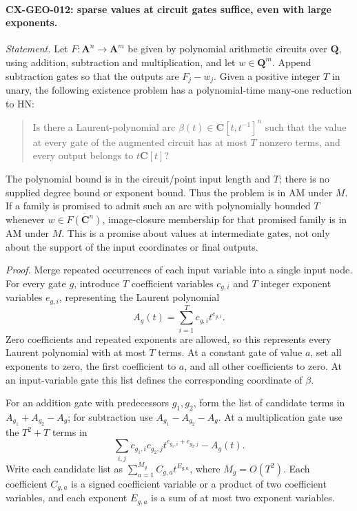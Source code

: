 \documentclass[11pt,a4paper]{article}
\begin{document}
\paragraph{CX-GEO-012: sparse values at circuit gates suffice, even with large exponents.}
\emph{Statement.} Let $F:\mathbf A^n\to\mathbf A^m$ be given by
polynomial arithmetic circuits over $\mathbf Q$, using addition,
subtraction and multiplication, and let $w\in\mathbf Q^m$.
Append subtraction gates so that the outputs are $F_j-w_j$.
Given a positive integer $T$ in unary, the following existence problem
has a polynomial-time many-one reduction to HN:
\begin{quote}
Is there a Laurent-polynomial arc
$\beta(t)\in\mathbf C[t,t^{-1}]^n$ such that the value at every gate
of the augmented circuit has at most $T$ nonzero terms, and every output
belongs to $t\mathbf C[t]$?
\end{quote}
The polynomial bound is in the circuit/point input length and $T$;
there is no supplied degree bound or exponent bound. Thus the problem
is in AM under $M$. If a family is promised to admit such an arc with
polynomially bounded $T$ whenever $w\in\overline{F(\mathbf C^n)}$,
image-closure membership for that promised family is in AM under $M$.
This is a promise about values at intermediate gates, not only about the
support of the input coordinates or final outputs.

\emph{Proof.} Merge repeated occurrences of each input variable into a
single input node. For every gate $g$, introduce $T$ coefficient
variables $c_{g,i}$ and $T$ integer exponent variables $e_{g,i}$,
representing the Laurent polynomial
\[
                       A_g(t)=\sum_{i=1}^T c_{g,i}t^{e_{g,i}}.
\]
Zero coefficients and repeated exponents are allowed, so this represents
every Laurent polynomial with at most $T$ terms. At a constant gate
of value $a$, set all exponents to zero, the first coefficient to $a$,
and all other coefficients to zero. At an input-variable gate this list
defines the corresponding coordinate of $\beta$.

For an addition gate with predecessors $g_1,g_2$, form the list of
candidate terms in $A_{g_1}+A_{g_2}-A_g$; for subtraction use
$A_{g_1}-A_{g_2}-A_g$. At a multiplication gate use the $T^2+T$ terms
in
\[
              \sum_{i,j}c_{g_1,i}c_{g_2,j}
                         t^{e_{g_1,i}+e_{g_2,j}}-A_g(t).
\]
Write each candidate list as
$\sum_{a=1}^{M_g}C_{g,a}t^{E_{g,a}}$, where $M_g=O(T^2)$.
Each coefficient $C_{g,a}$ is a signed coefficient variable or a
product of two coefficient variables, and each exponent $E_{g,a}$ is
a sum of at most two exponent variables.
\end{document}
